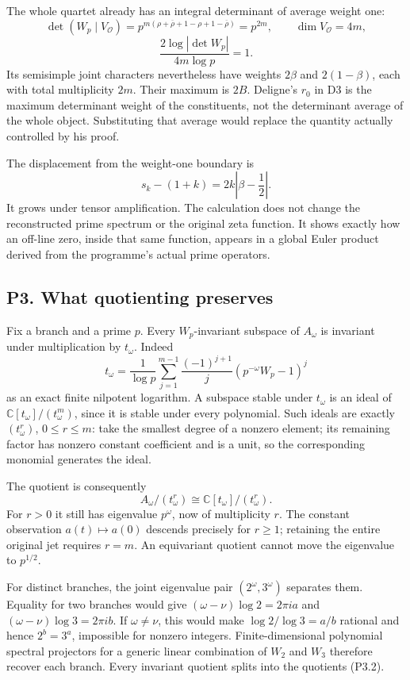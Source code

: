 The whole quartet already has an integral determinant of average weight
one: \[
\det(W_p\mid V_{\mathcal O})
=p^{m(\rho+\overline\rho+1-\rho+1-\overline\rho)}
=p^{2m},\qquad\dim V_{\mathcal O}=4m,
\] \[
\frac{2\log|\det W_p|}{4m\log p}=1.
\tag{P2.6b}
\] Its semisimple joint characters nevertheless have weights \(2\beta\)
and \(2(1-\beta)\), each with total multiplicity \(2m\). Their maximum
is \(2B\). Deligne's \(r_0\) in D3 is the maximum determinant weight of
the constituents, not the determinant average of the whole object.
Substituting that average would replace the quantity actually controlled
by his proof.

The displacement from the weight-one boundary is \[
s_k-(1+k)=2k\left|\beta-\frac12\right|.
\tag{P2.7}
\] It grows under tensor amplification. The calculation does not change
the reconstructed prime spectrum or the original zeta function. It shows
exactly how an off-line zero, inside that same function, appears in a
global Euler product derived from the programme's actual prime
operators.

\subsection{P3. What quotienting
preserves}\label{p3.-what-quotienting-preserves}

Fix a branch and a prime \(p\). Every \(W_p\)-invariant subspace of
\(A_\omega\) is invariant under multiplication by \(t_\omega\). Indeed
\[
t_\omega=
\frac1{\log p}
\sum_{j=1}^{m-1}\frac{(-1)^{j+1}}j
\left(p^{-\omega}W_p-1\right)^j
\tag{P3.1}
\] as an exact finite nilpotent logarithm. A subspace stable under
\(t_\omega\) is an ideal of \(\mathbb C[t_\omega]/(t_\omega^m)\), since
it is stable under every polynomial. Such ideals are exactly
\((t_\omega^r)\), \(0\le r\le m\): take the smallest degree of a nonzero
element; its remaining factor has nonzero constant coefficient and is a
unit, so the corresponding monomial generates the ideal.

The quotient is consequently \[
A_\omega/(t_\omega^r)\cong\mathbb C[t_\omega]/(t_\omega^r).
\tag{P3.2}
\] For \(r>0\) it still has eigenvalue \(p^\omega\), now of multiplicity
\(r\). The constant observation \(a(t)\mapsto a(0)\) descends precisely
for \(r\ge1\); retaining the entire original jet requires \(r=m\). An
equivariant quotient cannot move the eigenvalue to \(p^{1/2}\).

For distinct branches, the joint eigenvalue pair \((2^\omega,3^\omega)\)
separates them. Equality for two branches would give
\((\omega-\nu)\log2=2\pi ia\) and \((\omega-\nu)\log3=2\pi ib\). If
\(\omega\ne\nu\), this would make \(\log2/\log3=a/b\) rational and hence
\(2^b=3^a\), impossible for nonzero integers. Finite-dimensional
polynomial spectral projectors for a generic linear combination of
\(W_2\) and \(W_3\) therefore recover each branch. Every invariant
quotient splits into the quotients (P3.2).


